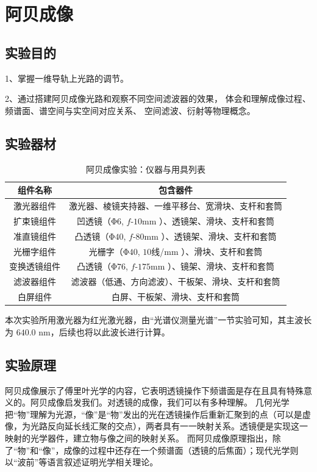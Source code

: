 \documentclass[UTF8]{article}
\theoremstyle{MyLineTheoremStyle} %
\theoremstyle{MyBlockTheoremStyle} %
\theoremstyle{MySubsubsectionStyle} %
\begin{document}
\section{阿贝成像}

\subsection{实验目的}

1、掌握一维导轨上光路的调节。

2、通过搭建阿贝成像光路和观察不同空间滤波器的效果，
体会和理解成像过程、频谱面、谱空间与实空间对应关系、
空间滤波、衍射等物理概念。

\subsection{实验器材}

\begin{table}[htbp]
    \centering
    \caption{阿贝成像实验：仪器与用具列表}
    \begin{tabular}{cc}
        \toprule
        组件名称 & 包含器件\\ \midrule
        激光器组件& 激光器、棱镜夹持器、一维平移台、宽滑块、支杆和套筒\\
        扩束镜组件& 凹透镜（Φ$ 6$, $f$-$10$mm ）、透镜架、滑块、支杆和套筒\\ 
        准直镜组件& 凸透镜（Φ$40$, $f$-$80$mm ）、透镜架、滑块、支杆和套筒\\ 
        光栅字组件& 光栅字（Φ$40$, $10$线/mm ）、滑块、支杆和套筒\\ 
        变换透镜组件& 凸透镜（Φ$76$, $f$-$175$mm ）、镜架、滑块、支杆和套筒\\ 
        滤波器组件& 滤波器（低通、方向滤波）、干板架、滑块、支杆和套筒\\ 
        白屏组件& 白屏、干板架、滑块、支杆和套筒\\ \bottomrule
    \end{tabular}
\end{table}

本次实验所用激光器为红光激光器，由“光谱仪测量光谱”一节实验可知，其主波长为 $640.0$ nm，后续也将以此波长进行计算。



\subsection{实验原理}

阿贝成像展示了傅里叶光学的内容，它表明透镜操作下频谱面是存在且具有特殊意义的。阿贝成像启发我们。对透镜的成像，我们可以有多种理解。
几何光学把“物”理解为光源，“像”是“物”发出的光在透镜操作后重新汇聚到的点（可以是虚像，为光路反向延长线汇聚的交点），两者具有一一映射关系。透镜便是实现这一映射的光学器件，建立物与像之间的映射关系。
而阿贝成像原理指出，除了“物”和“像”，成像的过程中还存在一个频谱面（透镜的后焦面）；现代光学则以“波前”等语言叙述证明光学相关理论。
\end{document}

